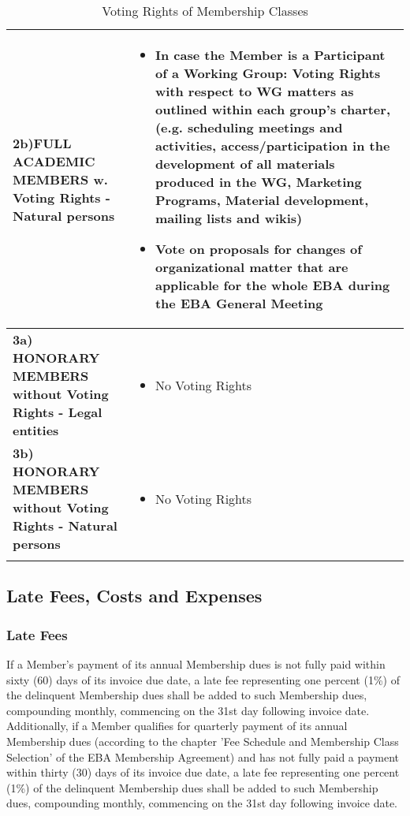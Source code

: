 \documentclass{article}
\begin{document}
\begin{longtable}{| p{} | p{} |}
   	\textbf{2b)FULL ACADEMIC MEMBERS w. Voting Rights - Natural persons} &
   	\begin{itemize}
   		\item In case the Member is a Participant of a Working Group: Voting Rights with respect to WG matters as outlined within each group's charter, (e.g. scheduling meetings and activities, access/participation in the development of all materials produced in the WG, Marketing Programs, Material development, mailing lists and wikis)
   		\item Vote on proposals for changes of organizational matter that are applicable for the whole EBA during the EBA General Meeting
   	\end{itemize}\\ \hline
    	
   	\textbf{3a) HONORARY MEMBERS without Voting Rights - Legal entities} &
   	\begin{itemize}
   		\item No Voting Rights
   	\end{itemize}\\ \hline
    	
   	\textbf{3b) HONORARY MEMBERS without Voting Rights - Natural persons} &
   	\begin{itemize}
   		\item No Voting Rights
   	\end{itemize}\\ \hline 
	    	
	\caption{Voting Rights of Membership Classes}
	\label{table:Mem_Voting}
\end{longtable}

\subsection{Late Fees, Costs and Expenses}

\subsubsection{Late Fees}

If a Member's payment of its annual Membership dues is not fully paid within sixty (60) days of its invoice due date, a late fee representing one percent (1\%) of the delinquent Membership dues shall be added to such Membership dues, compounding monthly, commencing on the 31st day following invoice date. 
Additionally, if a Member qualifies for quarterly payment of its annual Membership dues (according to the chapter 'Fee Schedule and Membership Class Selection' of the EBA Membership Agreement) and has not fully paid a payment within thirty (30) days of its invoice due date, a late fee representing one percent (1\%) of the delinquent Membership dues shall be added to such Membership dues, compounding monthly, commencing on the 31st day following invoice date.
\end{document}
